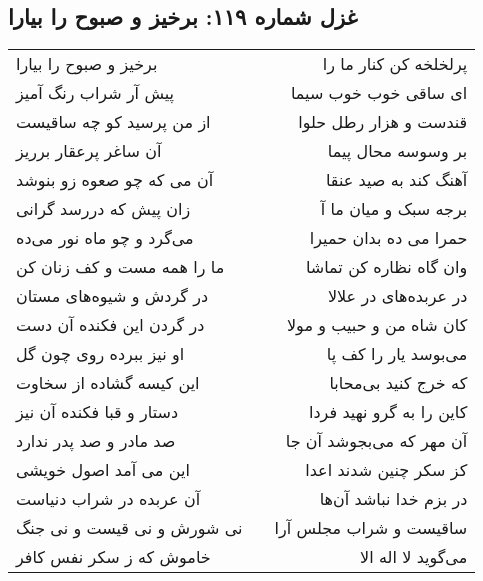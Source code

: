 \begin{center}
\section*{غزل شماره ۱۱۹: برخیز و صبوح را بیارا}
\label{sec:0119}
\begin{longtable}{l p{0.5cm} r}
برخیز و صبوح را بیارا
&&
پرلخلخه کن کنار ما را
\\
پیش آر شراب رنگ آمیز
&&
ای ساقی خوب خوب سیما
\\
از من پرسید کو چه ساقیست
&&
قندست و هزار رطل حلوا
\\
آن ساغر پرعقار برریز
&&
بر وسوسه محال پیما
\\
آن می که چو صعوه زو بنوشد
&&
آهنگ کند به صید عنقا
\\
زان پیش که دررسد گرانی
&&
برجه سبک و میان ما آ
\\
می‌گرد و چو ماه نور می‌ده
&&
حمرا می ده بدان حمیرا
\\
ما را همه مست و کف زنان کن
&&
وان گاه نظاره کن تماشا
\\
در گردش و شیوه‌های مستان
&&
در عربده‌های در علالا
\\
در گردن این فکنده آن دست
&&
کان شاه من و حبیب و مولا
\\
او نیز ببرده روی چون گل
&&
می‌بوسد یار را کف پا
\\
این کیسه گشاده از سخاوت
&&
که خرج کنید بی‌محابا
\\
دستار و قبا فکنده آن نیز
&&
کاین را به گرو نهید فردا
\\
صد مادر و صد پدر ندارد
&&
آن مهر که می‌بجوشد آن جا
\\
این می آمد اصول خویشی
&&
کز سکر چنین شدند اعدا
\\
آن عربده در شراب دنیاست
&&
در بزم خدا نباشد آن‌ها
\\
نی شورش و نی قیست و نی جنگ
&&
ساقیست و شراب مجلس آرا
\\
خاموش که ز سکر نفس کافر
&&
می‌گوید لا اله الا
\\
\end{longtable}
\end{center}
